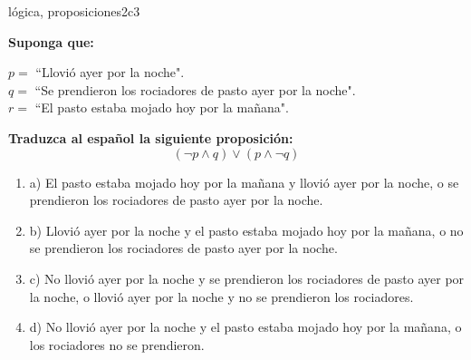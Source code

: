 \documentclass{article}
\begin{document}
\begin{question}{4}{lógica, proposiciones}{2}{c}{3}{
\textbf{Suponga que:} \smallskip

\(p = \) ``Llovió ayer por la noche".\\
\(q = \) ``Se prendieron los rociadores de pasto ayer por la noche".\\
\(r = \) ``El pasto estaba mojado hoy por la mañana".\smallskip

\textbf{Traduzca al español la siguiente proposición:}
\[
(\neg p \land q) \lor (p \land \neg q)
\]

\begin{enumerate}
   \item a) El pasto estaba mojado hoy por la mañana y llovió ayer por la noche, o se prendieron los rociadores de pasto ayer por la noche.
   \item b) Llovió ayer por la noche y el pasto estaba mojado hoy por la mañana, o no se prendieron los rociadores de pasto ayer por la noche.
   \item c) No llovió ayer por la noche y se prendieron los rociadores de pasto ayer por la noche, o llovió ayer por la noche y no se prendieron los rociadores.
   \item d) No llovió ayer por la noche y el pasto estaba mojado hoy por la mañana, o los rociadores no se prendieron.
\end{enumerate}
}
\end{question}
\end{document}

